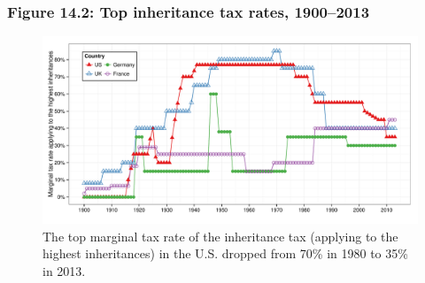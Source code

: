 \documentclass[t]{beamer}\usepackage[]{graphicx}\usepackage[]{color}
\newenvironment{knitrout}{}{} %
\begin{document}
\begin{frame}[label=Figure142]
\frametitle{Figure 14.2: Top inheritance tax rates, 1900--2013}
\begin{figure}[t]
\begin{minipage}[b]{\textwidth}
\centering
\begin{knitrout}\footnotesize
{}\color{fgcolor}

{\centering \includegraphics[width=1\linewidth]{figures/color/Figure_14_2} 

}



\end{knitrout}
\caption{The top marginal tax rate of the inheritance tax (applying to the highest inheritances) in the U.S. dropped from 70\% in 1980 to 35\% in 2013.}
\end{minipage}
\end{figure}
\end{frame}
\end{document}
